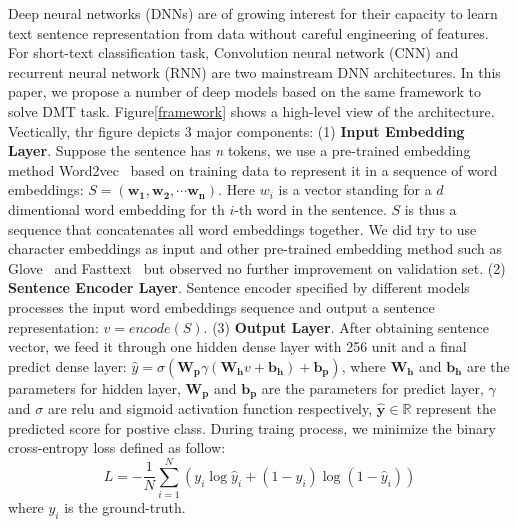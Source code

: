 \documentclass[11pt,a4paper]{article}
\begin{document}
Deep neural networks (DNNs) are of growing interest for their capacity to learn text sentence representation from data without careful engineering of features.  For short-text classification task, Convolution neural network (CNN) and recurrent neural network (RNN) are two mainstream DNN architectures. In this paper, we propose a number of deep models based on the same framework to solve DMT task. Figure\ref{framework} shows a high-level view of the architecture. Vectically, thr figure depicts 3 major components: (1) \textbf{Input Embedding Layer}. Suppose the sentence has \textit{n} tokens, we use a pre-trained embedding method Word2vec~\cite{DBLP:journals/corr/abs-1301-3781} based on training data to represent it in a sequence of word embeddings: $S=\left(\mathbf{w}_{\mathbf{1}}, \mathbf{w}_{\mathbf{2}}, \cdots \mathbf{w}_{\mathbf{n}}\right)$. Here $w_i$ is a vector standing for a $d$ dimentional word embedding for th $i$-th word in the sentence. $S$ is thus a sequence that concatenates all word embeddings together. We did try to use character embeddings as input and other pre-trained embedding method such as Glove~\cite{pennington2014glove} and Fasttext~\cite{bojanowski2017enriching} but observed no further improvement on validation set. (2) \textbf{Sentence Encoder Layer}. Sentence encoder specified by different models processes the input word embeddings sequence and output a sentence representation: $v=encode\left(S\right)$. (3) \textbf{Output Layer}. After obtaining sentence vector, we feed it through one hidden dense layer with 256 unit and a final predict dense layer: $\hat{y}=\sigma\left(\mathbf{W_{p}} \gamma\left(\mathbf{W_{h}} v+\mathbf{b_{h}}\right)+\mathbf{b_{p}}\right)$, where $\mathbf{W_{h}}$ and $\mathbf{b_{h}}$ are the parameters for hidden layer, $\mathbf{W_{p}}$ and $\mathbf{b_{p}}$ are the parameters for predict layer, $\gamma$ and $\sigma$ are relu and sigmoid activation function respectively, $\hat{\mathbf{y}} \in \mathbb{R}$ represent the predicted score for postive class. During traing process, we minimize the binary cross-entropy loss defined as follow:
\begin{equation} 
L=-\frac{1}{N} \sum_{i=1}^{N}\left(y_{i} \log \hat{y}_{i}+\left(1-y_{i}\right) \log \left(1-\hat{y}_{i}\right)\right)
\end{equation}
 where $y_{i}$ is the ground-truth.
\end{document}
